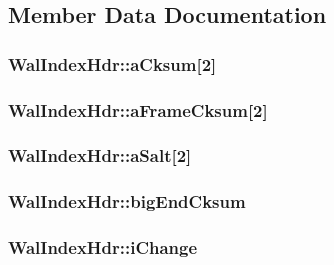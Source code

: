 \subsection{Member Data Documentation}
\hypertarget{struct_wal_index_hdr_aa202339b02766d088717bfce9e3a9c0e}{
\subsubsection[{a\-Cksum}]{ Wal\-Index\-Hdr\-::a\-Cksum\mbox{[}2\mbox{]}}}\label{struct_wal_index_hdr_aa202339b02766d088717bfce9e3a9c0e}
\hypertarget{struct_wal_index_hdr_a425dff294e0f0b30b6819c273404c721}{
\subsubsection[{a\-Frame\-Cksum}]{ Wal\-Index\-Hdr\-::a\-Frame\-Cksum\mbox{[}2\mbox{]}}}\label{struct_wal_index_hdr_a425dff294e0f0b30b6819c273404c721}
\hypertarget{struct_wal_index_hdr_af99b92f673fd7ba1e4e4f9feb955453f}{
\subsubsection[{a\-Salt}]{ Wal\-Index\-Hdr\-::a\-Salt\mbox{[}2\mbox{]}}}\label{struct_wal_index_hdr_af99b92f673fd7ba1e4e4f9feb955453f}
\hypertarget{struct_wal_index_hdr_aa6be53a6a60ea0b2a97a245b5ca68d61}{
\subsubsection[{big\-End\-Cksum}]{ Wal\-Index\-Hdr\-::big\-End\-Cksum}}\label{struct_wal_index_hdr_aa6be53a6a60ea0b2a97a245b5ca68d61}
\hypertarget{struct_wal_index_hdr_a9fafc4d4af9ab741b3b8733380a7927f}{
\subsubsection[{i\-Change}]{ Wal\-Index\-Hdr\-::i\-Change}}\label{struct_wal_index_hdr_a9fafc4d4af9ab741b3b8733380a7927f}
